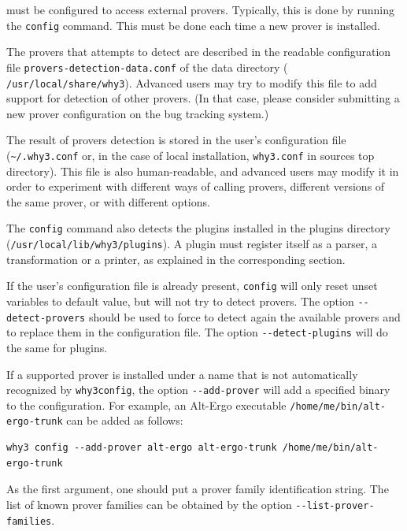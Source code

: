 \why must be configured to access external provers. Typically, this is done
by running the \texttt{config} command.
This must be done each time a new prover is installed.%
%

The provers that \why attempts to detect are described in
the readable configuration file \texttt{provers-detection-data.conf}
of the \why data directory (\eg
\texttt{/usr/local/share/why3}). Advanced users may try to modify this
file to add support for detection of other provers. (In that case,
please consider submitting a new prover configuration on the bug
tracking system.)

The result of provers detection is stored in the user's
configuration file (\verb+~/.why3.conf+ or, in the case of local
installation, \verb+why3.conf+ in \why sources top directory). This file
is also human-readable, and advanced users may modify it in order to
experiment with different ways of calling provers, \eg different
versions of the same prover, or with different options.

The \texttt{config} command also detects the plugins installed in the \why
plugins directory (\eg \texttt{/usr/local/lib/why3/plugins}). A
plugin must register itself as a parser, a transformation or a
printer, as explained in the corresponding section.

If the user's configuration file is already present,
\texttt{config} will only reset unset variables to default value,
but will not try to detect provers.
The option \verb|--detect-provers| should be used to force
\why to detect again the available
provers and to replace them in the configuration file. The option
\verb|--detect-plugins| will do the same for plugins.

If a supported prover is installed under a name
that is not automatically recognized by \texttt{why3config},
the option \verb|--add-prover| will add a specified binary
to the configuration. For example, an Alt-Ergo executable
\verb|/home/me/bin/alt-ergo-trunk| can be added as follows:
\begin{verbatim}
why3 config --add-prover alt-ergo alt-ergo-trunk /home/me/bin/alt-ergo-trunk
\end{verbatim}
As the first argument, one should put a prover family
identification string. The list of known prover families
can be obtained by the option \verb|--list-prover-families|.

